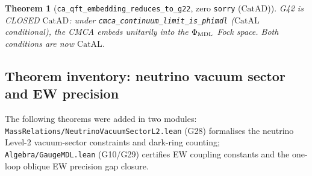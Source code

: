 \documentclass[11pt,a4paper]{article}
\newtheorem{theorem}{Theorem}[section]
\theoremstyle{definition}
\newcommand{\CatAL}{\ensuremath{\mathrm{CatAL}}}
\newcommand{\CatAD}{\ensuremath{\mathrm{CatAD}}}
\begin{document}
\begin{theorem}[\lstinline|ca_qft_embedding_reduces_to_g22|, zero \texttt{sorry} ($\CatAD$)]
G42 is CLOSED $\CatAD$: under \lstinline|cmca_continuum_limit_is_phimdl| ($\CatAL$ conditional),
the CMCA embeds unitarily into the $\Phi_{\rm MDL}$ Fock space.  Both conditions are now
$\CatAL$.
\end{theorem}

\subsection{Theorem inventory: neutrino vacuum sector and EW precision}\label{subsec:new-theorem-inventory-g28-g29}

The following theorems were added in two modules: \texttt{MassRelations/\allowbreak NeutrinoVacuumSectorL2.lean} (G28) formalises the neutrino Level-2 vacuum-sector constraints and dark-ring counting; \texttt{Algebra/GaugeMDL.lean} (G10/G29) certifies EW coupling constants and the one-loop oblique EW precision gap closure.
\end{document}
